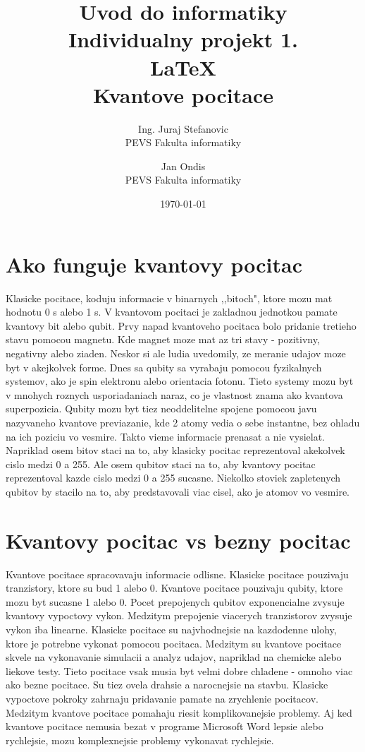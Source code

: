 \documentclass{article}
\title{Uvod do informatiky\\
\bigbreak
\bigbreak
\bigbreak
\bigbreak
\bigbreak
\bigbreak
\bigbreak
\bigbreak
\bigbreak
\bigbreak
\bigbreak
\bigbreak
\bigbreak
\bigbreak
\bigbreak
\bigbreak
\bigbreak
\bigbreak
  Individualny projekt 1.
  \\\LaTeX{} \\
  Kvantove pocitace
\bigbreak
\bigbreak
\bigbreak
\bigbreak
\bigbreak
\bigbreak
\bigbreak
\bigbreak
\bigbreak
\bigbreak
\bigbreak
\bigbreak
\bigbreak
\bigbreak
\bigbreak
\bigbreak
}
\author{Ing. Juraj Stefanovic  \\
	PEVS Fakulta informatiky  \\
	\and
	Jan Ondis \\
	PEVS Fakulta informatiky \\
	}
\date{\today
}
\begin{document}
\maketitle

\section{Ako funguje kvantovy pocitac}
\bigbreak
Klasicke pocitace, koduju informacie v binarnych ,,bitoch", ktore mozu mat hodnotu 0 s alebo 1 s. V kvantovom pocitaci je zakladnou jednotkou pamate kvantovy bit alebo qubit.
\bigbreak
Prvy napad kvantoveho pocitaca bolo pridanie tretieho stavu pomocou magnetu.
Kde magnet moze mat az tri stavy - pozitivny, negativny alebo ziaden. Neskor si ale ludia uvedomily, ze meranie udajov moze byt v akejkolvek forme. Dnes sa qubity sa vyrabaju pomocou fyzikalnych systemov, ako je spin elektronu alebo orientacia fotonu. Tieto systemy mozu byt v mnohych roznych usporiadaniach naraz, co je vlastnost znama ako kvantova superpozicia. Qubity mozu byt tiez neoddelitelne spojene pomocou javu nazyvaneho kvantove previazanie, kde 2 atomy vedia o sebe instantne, bez ohladu na ich poziciu vo vesmire. Takto vieme informacie prenasat a nie vysielat.
\bigbreak
Napriklad osem bitov staci na to, aby klasicky pocitac reprezentoval akekolvek cislo medzi 0 a 255. Ale osem qubitov staci na to, aby kvantovy pocitac reprezentoval kazde cislo medzi 0 a 255 sucasne. Niekolko stoviek zapletenych qubitov by stacilo na to, aby predstavovali viac cisel, ako je atomov vo vesmire.

\section{Kvantovy pocitac vs bezny pocitac}
Kvantove pocitace spracovavaju informacie odlisne. Klasicke pocitace pouzivaju tranzistory, ktore su bud 1 alebo 0. Kvantove pocitace pouzivaju qubity, ktore mozu byt sucasne 1 alebo 0. Pocet prepojenych qubitov exponencialne zvysuje kvantovy vypoctovy vykon. Medzitym prepojenie viacerych tranzistorov zvysuje vykon iba linearne.
\bigbreak
Klasicke pocitace su najvhodnejsie na kazdodenne ulohy, ktore je potrebne vykonat pomocou pocitaca. Medzitym su kvantove pocitace skvele na vykonavanie simulacii a analyz udajov, napriklad na chemicke alebo liekove testy. Tieto pocitace vsak musia byt velmi dobre chladene - omnoho viac ako bezne pocitace. Su tiez ovela drahsie a narocnejsie na stavbu.
\bigbreak
Klasicke vypoctove pokroky zahrnaju pridavanie pamate na zrychlenie pocitacov. Medzitym kvantove pocitace pomahaju riesit komplikovanejsie problemy. Aj ked kvantove pocitace nemusia bezat v programe Microsoft Word lepsie alebo rychlejsie, mozu komplexnejsie problemy vykonavat rychlejsie.
\bigbreak
\end{document}
